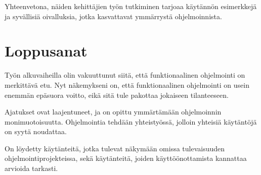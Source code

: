 Yhteenvetona, näiden kehittäjien työn tutkiminen tarjoaa käytännön esimerkkejä ja syvällisiä oivalluksia, jotka kasvattavat ymmärrystä ohjelmoinnista.

\section{Loppusanat}

Työn alkuvaiheilla olin vakuuttunut siitä, että funktionaalinen ohjelmointi on merkittävä etu. Nyt näkemykseni on, että funktionaalinen ohjelmointi on usein enemmän epäsuora voitto, eikä sitä tule pakottaa jokaiseen tilanteeseen.

Ajatukset ovat laajentuneet, ja on opittu ymmärtämään ohjelmoinnin monimuotoisuutta. Ohjelmointia tehdään yhteistyössä, jolloin yhteisiä käytäntöjä on syytä noudattaa.

On löydetty käytänteitä, jotka tulevat näkymään omissa tulevaisuuden ohjelmointiprojekteissa, sekä käytänteitä, joiden käyttöönottamista kannattaa arvioida tarkasti.

